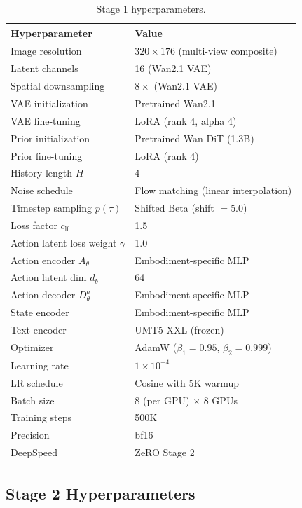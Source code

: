 \documentclass{article}
\begin{document}
\begin{table}[h]
\centering
\caption{Stage 1 hyperparameters.}
\label{tab:app_stage1}
\begin{tabular}{ll}
\toprule
\textbf{Hyperparameter} & \textbf{Value} \\
\midrule
Image resolution & $320 \times 176$ (multi-view composite) \\
Latent channels & 16 (Wan2.1 VAE) \\
Spatial downsampling & $8\times$ (Wan2.1 VAE) \\
VAE initialization & Pretrained Wan2.1 \\
VAE fine-tuning & LoRA (rank 4, alpha 4) \\
Prior initialization & Pretrained Wan DiT (1.3B) \\
Prior fine-tuning & LoRA (rank 4) \\
History length $H$ & 4 \\
Noise schedule & Flow matching (linear interpolation) \\
Timestep sampling $p(\tau)$ & Shifted Beta (shift $= 5.0$) \\
Loss factor $c_{\text{lf}}$ & 1.5 \\
Action latent loss weight $\gamma$ & 1.0 \\
Action encoder $A_\theta$ & Embodiment-specific MLP \\
Action latent dim $d_b$ & 64 \\
Action decoder $D_\theta^a$ & Embodiment-specific MLP \\
State encoder & Embodiment-specific MLP \\
Text encoder & UMT5-XXL (frozen) \\
Optimizer & AdamW ($\beta_1 = 0.95$, $\beta_2 = 0.999$) \\
Learning rate & $1 \times 10^{-4}$ \\
LR schedule & Cosine with 5K warmup \\
Batch size & 8 (per GPU) $\times$ 8 GPUs \\
Training steps & 500K \\
Precision & bf16 \\
DeepSpeed & ZeRO Stage 2 \\
\bottomrule
\end{tabular}
\end{table}

\subsection{Stage 2 Hyperparameters}
\end{document}
